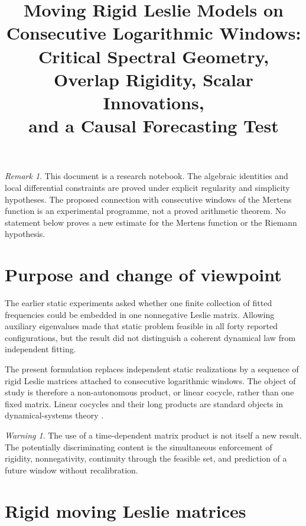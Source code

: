 \documentclass[11pt]{amsart}
\title[Moving Rigid Leslie Models]{Moving Rigid Leslie Models on Consecutive Logarithmic Windows:\\Critical Spectral Geometry, Overlap Rigidity, Scalar Innovations,\\and a Causal Forecasting Test}
\author{}
\date{}
\numberwithin{equation}{section}
\theoremstyle{plain}
\theoremstyle{definition}
\theoremstyle{remark}
\newtheorem{remark}[theorem]{Remark}
\newtheorem{warning}[theorem]{Warning}
\begin{document}
\maketitle
\tableofcontents
\bigskip

\begin{remark}
\label{rem:status}
This document is a research notebook.  The algebraic identities and local differential constraints are proved under explicit regularity and simplicity hypotheses.  The proposed connection with consecutive windows of the Mertens function is an experimental programme, not a proved arithmetic theorem.  No statement below proves a new estimate for the Mertens function or the Riemann hypothesis.
\end{remark}

\section{Purpose and change of viewpoint}
\label{sec:purpose}

The earlier static experiments asked whether one finite collection of fitted frequencies could be embedded in one nonnegative Leslie matrix.  Allowing auxiliary eigenvalues made that static problem feasible in all forty reported configurations, but the result did not distinguish a coherent dynamical law from independent fitting.

The present formulation replaces independent static realizations by a sequence of rigid Leslie matrices attached to consecutive logarithmic windows.  The object of study is therefore a non-autonomous product, or linear cocycle, rather than one fixed matrix.  Linear cocycles and their long products are standard objects in dynamical-systems theory \cite{DuarteKlein2016}.

\begin{warning}
\label{warn:no_automatic_novelty}
The use of a time-dependent matrix product is not itself a new result.  The potentially discriminating content is the simultaneous enforcement of rigidity, nonnegativity, continuity through the feasible set, and prediction of a future window without recalibration.
\end{warning}

\section{Rigid moving Leslie matrices}
\label{sec:rigid_moving_leslie}
\end{document}
